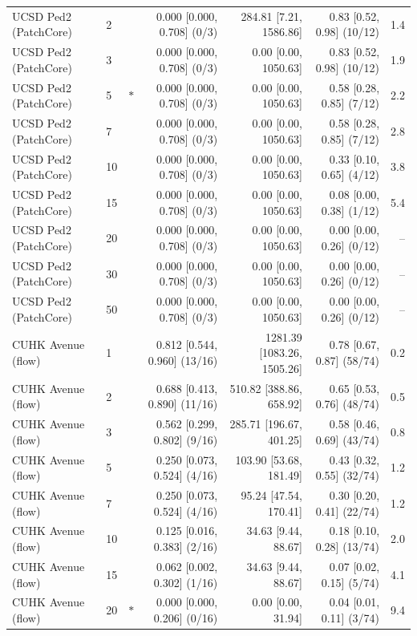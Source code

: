 \begin{table}[t]
{\begin{tabular}{llcrrrr}
UCSD Ped2 (PatchCore) & 2 &  & 0.000 [0.000, 0.708] (0/3) & 284.81 [7.21, 1586.86] & 0.83 [0.52, 0.98] (10/12) & 1.4 \\
UCSD Ped2 (PatchCore) & 3 &  & 0.000 [0.000, 0.708] (0/3) & 0.00 [0.00, 1050.63] & 0.83 [0.52, 0.98] (10/12) & 1.9 \\
UCSD Ped2 (PatchCore) & 5 & $\ast$ & 0.000 [0.000, 0.708] (0/3) & 0.00 [0.00, 1050.63] & 0.58 [0.28, 0.85] (7/12) & 2.2 \\
UCSD Ped2 (PatchCore) & 7 &  & 0.000 [0.000, 0.708] (0/3) & 0.00 [0.00, 1050.63] & 0.58 [0.28, 0.85] (7/12) & 2.8 \\
UCSD Ped2 (PatchCore) & 10 &  & 0.000 [0.000, 0.708] (0/3) & 0.00 [0.00, 1050.63] & 0.33 [0.10, 0.65] (4/12) & 3.8 \\
UCSD Ped2 (PatchCore) & 15 &  & 0.000 [0.000, 0.708] (0/3) & 0.00 [0.00, 1050.63] & 0.08 [0.00, 0.38] (1/12) & 5.4 \\
UCSD Ped2 (PatchCore) & 20 &  & 0.000 [0.000, 0.708] (0/3) & 0.00 [0.00, 1050.63] & 0.00 [0.00, 0.26] (0/12) & -- \\
UCSD Ped2 (PatchCore) & 30 &  & 0.000 [0.000, 0.708] (0/3) & 0.00 [0.00, 1050.63] & 0.00 [0.00, 0.26] (0/12) & -- \\
UCSD Ped2 (PatchCore) & 50 &  & 0.000 [0.000, 0.708] (0/3) & 0.00 [0.00, 1050.63] & 0.00 [0.00, 0.26] (0/12) & -- \\
CUHK Avenue (flow) & 1 &  & 0.812 [0.544, 0.960] (13/16) & 1281.39 [1083.26, 1505.26] & 0.78 [0.67, 0.87] (58/74) & 0.2 \\
CUHK Avenue (flow) & 2 &  & 0.688 [0.413, 0.890] (11/16) & 510.82 [388.86, 658.92] & 0.65 [0.53, 0.76] (48/74) & 0.5 \\
CUHK Avenue (flow) & 3 &  & 0.562 [0.299, 0.802] (9/16) & 285.71 [196.67, 401.25] & 0.58 [0.46, 0.69] (43/74) & 0.8 \\
CUHK Avenue (flow) & 5 &  & 0.250 [0.073, 0.524] (4/16) & 103.90 [53.68, 181.49] & 0.43 [0.32, 0.55] (32/74) & 1.2 \\
CUHK Avenue (flow) & 7 &  & 0.250 [0.073, 0.524] (4/16) & 95.24 [47.54, 170.41] & 0.30 [0.20, 0.41] (22/74) & 1.2 \\
CUHK Avenue (flow) & 10 &  & 0.125 [0.016, 0.383] (2/16) & 34.63 [9.44, 88.67] & 0.18 [0.10, 0.28] (13/74) & 2.0 \\
CUHK Avenue (flow) & 15 &  & 0.062 [0.002, 0.302] (1/16) & 34.63 [9.44, 88.67] & 0.07 [0.02, 0.15] (5/74) & 4.1 \\
CUHK Avenue (flow) & 20 & $\ast$ & 0.000 [0.000, 0.206] (0/16) & 0.00 [0.00, 31.94] & 0.04 [0.01, 0.11] (3/74) & 9.4 \\

\end{tabular}}
\end{table}
